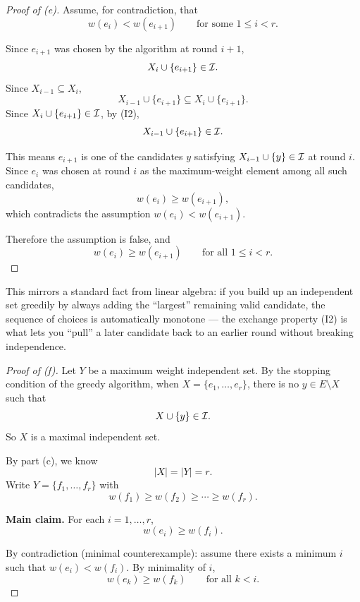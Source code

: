 \begin{solbox}[long]
\begin{solution}[(e)]
\begin{proof}[Proof of (e)]
    Assume, for contradiction, that
    \[
        w(e_i) < w(e_{i+1}) \qquad \text{for some } 1\le i<r.
    \]

    Since $e_{i+1}$ was chosen by the algorithm at round $i+1$,
    \[
        X_i \cup \{e_{i+1}\} \in \mathcal{I}.
    \]
    Since $X_{i-1}\subseteq X_i$,
    \[
        X_{i-1}\cup\{e_{i+1}\} \subseteq X_i\cup\{e_{i+1}\}.
    \]
    Since $X_i\cup\{e_{i+1}\}\in\mathcal{I}$, by (I2),
    \[
        X_{i-1}\cup\{e_{i+1}\}\in\mathcal{I}.
    \]

    This means $e_{i+1}$ is one of the candidates $y$ satisfying
    $X_{i-1}\cup\{y\}\in\mathcal{I}$ at round $i$. Since $e_i$ was chosen at
    round $i$ as the maximum-weight element among all such
    candidates,
    \[
        w(e_i) \ge w(e_{i+1}),
    \]
    which contradicts the assumption $w(e_i) < w(e_{i+1})$.

    Therefore the assumption is false, and
    \[
        w(e_i)\ge w(e_{i+1}) \qquad \text{for all } 1\le i<r.
    \]
\end{proof}

\begin{remark}
    This mirrors a standard fact from linear algebra: if you build up
    an independent set greedily by always adding the ``largest''
    remaining valid candidate, the sequence of choices is
    automatically monotone --- the exchange property (I2) is what
    lets you ``pull'' a later candidate back to an earlier round
    without breaking independence.
\end{remark}
\end{solution}

\begin{solution}[(f)]
\begin{proof}[Proof of (f)]
    Let $Y$ be a maximum weight independent set. By the stopping
    condition of the greedy algorithm, when $X=\{e_1,\dots,e_r\}$,
    there is no $y\in E\setminus X$ such that
    \[
        X\cup\{y\}\in\mathcal{I}.
    \]
    So $X$ is a maximal independent set.

    By part (c), we know
    \[
        |X|=|Y|=r.
    \]
    Write $Y=\{f_1,\dots,f_r\}$ with
    \[
        w(f_1)\ge w(f_2) \ge \cdots \ge w(f_r).
    \]

    \medskip
    \textbf{Main claim.} For each $i=1,\dots,r$,
    \[
        w(e_i)\ge w(f_i).
    \]

    By contradiction (minimal counterexample): assume there exists a
    minimum $i$ such that $w(e_i) < w(f_i)$. By minimality of $i$,
    \[
        w(e_k)\ge w(f_k) \qquad \text{for all } k<i.
    \]


\end{proof}
\end{solution}
\end{solbox}
